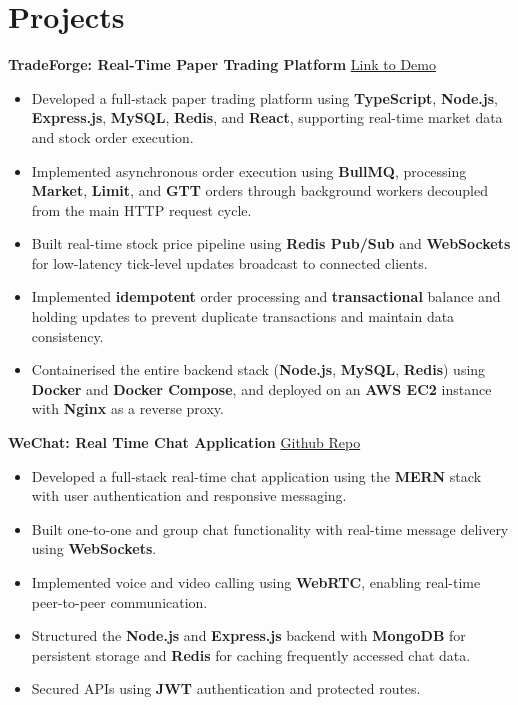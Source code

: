 \documentclass[a4paper,11pt]{article}
\begin{document}
\section{Projects}

\noindent\textbf{TradeForge: Real-Time Paper Trading Platform}
\hfill \href{https://trade-forge-kappa.vercel.app/}{Link to Demo}

\begin{itemize}[leftmargin=1.15em, itemsep=0.5pt, topsep=0.5pt, parsep=0pt, partopsep=0pt]
    \item Developed a full-stack paper trading platform using \textbf{TypeScript}, \textbf{Node.js}, \textbf{Express.js}, \textbf{MySQL}, \textbf{Redis}, and \textbf{React}, supporting real-time market data and stock order execution.
    \item Implemented asynchronous order execution using \textbf{BullMQ}, processing \textbf{Market}, \textbf{Limit}, and \textbf{GTT} orders through background workers decoupled from the main HTTP request cycle.
    \item Built real-time stock price pipeline using \textbf{Redis Pub/Sub} and \textbf{WebSockets} for low-latency tick-level updates broadcast to connected clients.
    \item Implemented \textbf{idempotent} order processing and \textbf{transactional} balance and holding updates to prevent duplicate transactions and maintain data consistency.
    \item Containerised the entire backend stack (\textbf{Node.js}, \textbf{MySQL}, \textbf{Redis}) using \textbf{Docker} and \textbf{Docker Compose}, and deployed on an \textbf{AWS EC2} instance with \textbf{Nginx} as a reverse proxy.
\end{itemize}

\vspace{2pt}
\noindent\textbf{WeChat: Real Time Chat Application}
\hfill \href{https://github.com/VaibhavPatidar26/ChatApp}{Github Repo}

\begin{itemize}[leftmargin=1.15em, itemsep=0.5pt, topsep=0.5pt, parsep=0pt, partopsep=0pt]
    \item Developed a full-stack real-time chat application using the \textbf{MERN} stack with user authentication and responsive messaging.
    \item Built one-to-one and group chat functionality with real-time message delivery using \textbf{WebSockets}.
    \item Implemented voice and video calling using \textbf{WebRTC}, enabling real-time peer-to-peer communication.
    \item Structured the \textbf{Node.js} and \textbf{Express.js} backend with \textbf{MongoDB} for persistent storage and \textbf{Redis} for caching frequently accessed chat data.
    \item Secured APIs using \textbf{JWT} authentication and protected routes.
\end{itemize}
\end{document}
